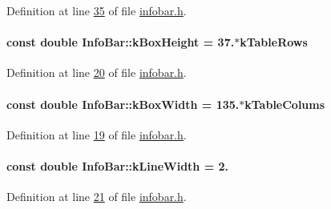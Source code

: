 Definition at line \hyperlink{infobar_8h_source_l00035}{35} of file \hyperlink{infobar_8h_source}{infobar.\+h}.

\hypertarget{class_info_bar_aedf2e766968ea9ba3e691f24efb8c117}{}
\paragraph[{k\+Box\+Height}]{\setlength{\rightskip}{0pt plus 5cm}const double Info\+Bar\+::k\+Box\+Height = 37.$\ast${\bf k\+Table\+Rows}\hspace{0.3cm}{\ttfamily [static]}}\label{class_info_bar_aedf2e766968ea9ba3e691f24efb8c117}


Definition at line \hyperlink{infobar_8h_source_l00020}{20} of file \hyperlink{infobar_8h_source}{infobar.\+h}.

\hypertarget{class_info_bar_a58f7773f4265d7e759f2eeb4c9aac48d}{}
\paragraph[{k\+Box\+Width}]{\setlength{\rightskip}{0pt plus 5cm}const double Info\+Bar\+::k\+Box\+Width = 135.$\ast${\bf k\+Table\+Colums}\hspace{0.3cm}{\ttfamily [static]}}\label{class_info_bar_a58f7773f4265d7e759f2eeb4c9aac48d}


Definition at line \hyperlink{infobar_8h_source_l00019}{19} of file \hyperlink{infobar_8h_source}{infobar.\+h}.

\hypertarget{class_info_bar_a9592abdb63cc3cfffc6e5826f998a353}{}
\paragraph[{k\+Line\+Width}]{\setlength{\rightskip}{0pt plus 5cm}const double Info\+Bar\+::k\+Line\+Width = 2.\hspace{0.3cm}{\ttfamily [static]}}\label{class_info_bar_a9592abdb63cc3cfffc6e5826f998a353}


Definition at line \hyperlink{infobar_8h_source_l00021}{21} of file \hyperlink{infobar_8h_source}{infobar.\+h}.

\hypertarget{class_info_bar_a18194bb46d36b00aa9f0d01f24a87617}{}
